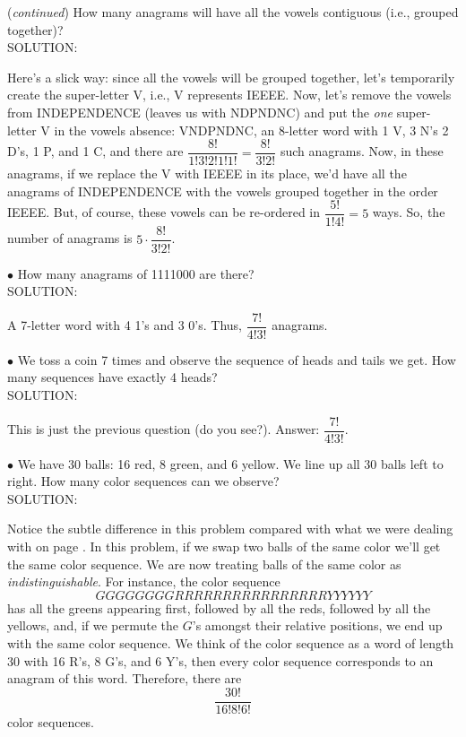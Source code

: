 \documentclass[12pt]{article}
\begin{document}
\noindent ({\em continued}) How many anagrams will have all the vowels contiguous (i.e., grouped together)?\\

\noindent SOLUTION:

Here's a slick way: since all the vowels will be grouped together,
let's temporarily create the super-letter V, i.e., V represents IEEEE.  Now, let's remove the vowels from
INDEPENDENCE (leaves us with NDPNDNC) and put the {\em one} super-letter V in the vowels absence: VNDPNDNC,  an 8-letter word with
1 V, 3 N's 2 D's, 1 P, and 1 C, and there are $\dfrac {8!}{1!3!2!1!1!} = \dfrac {8!}{3!2!}$ such anagrams.  Now, in these anagrams, if we replace
the V with IEEEE in its place, we'd have all the anagrams of INDEPENDENCE with the vowels grouped together in the order IEEEE.
But, of course, these vowels can be re-ordered in $\dfrac {5!}{1!4!}=5$ ways. So, the number of anagrams is $5\cdot\dfrac {8!}{3!2!}$.\\


\newpage


\noindent $\bullet$ How many anagrams of 1111000 are there?\\

\noindent SOLUTION:

A 7-letter word with 4 1's and 3 0's. Thus, $\dfrac {7!}{4!3!}$ anagrams.\\

\bigskip

\noindent $\bullet$ We toss a coin 7 times and observe the sequence of heads and tails we get. How many sequences have exactly 4 heads?\label{7cointosses4heads}\\

\noindent SOLUTION:

This is just the previous question (do you see?). Answer: $\dfrac {7!}{4!3!}$.\\

\bigskip

\noindent $\bullet$\label{30ballsexample2} We have 30 balls: 16 red, 8 green, and 6 yellow.  We line up all 30 balls left to right.  How many color sequences can we observe?\\

\noindent SOLUTION:

Notice the subtle difference in this problem compared with what we were dealing with on page \pageref{30ballsexample}.
In this problem, if we swap two balls of the same color we'll get the same color sequence.  We are now treating balls of the same color as {\em indistinguishable}.
For instance, the color sequence
$$GGGGGGGGRRRRRRRRRRRRRRRRYYYYYY$$
has all the greens appearing first, followed by all the reds, followed by all the yellows, and,
if we permute the $G$'s amongst their relative positions, we end up with the same color sequence.
We think of the color sequence as a word of length 30
with 16 R's, 8 G's, and 6 Y's, then every color sequence corresponds to an anagram of this word.
Therefore, there are
$$\dfrac {30!}{16!8!6!}$$
\noindent color sequences.\\
\end{document}
